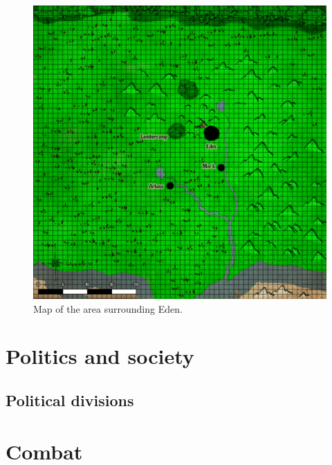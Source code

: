 \documentclass[letterpaper,12pt]{article}
\begin{document}
\begin{figure}[h] 
        \centering \includegraphics[scale=0.31]{edenAreaMap01.png}
        \caption{Map of the area surrounding Eden.}
\end{figure}


\section{Politics and society}\label{Politics}

\subsection{Political divisions}\label{PoliticalDivisions}


\section{Combat}\label{Combat}
\end{document}
